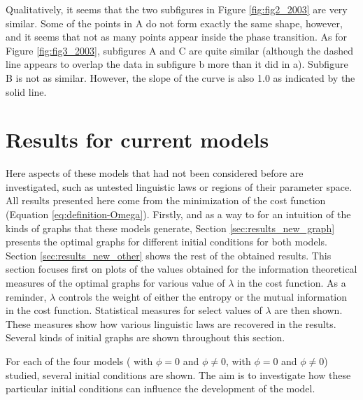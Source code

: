 Qualitatively, it seems that the two subfigures in Figure \ref{fig:fig2_2003} are very similar.
Some of the points in A do not form exactly the same shape, however, and it seems that not as many points appear inside the phase transition.
As for Figure \ref{fig:fig3_2003}, subfigures A and C are quite similar (although the dashed line appears to overlap the data in subfigure b more than it did in a).
Subfigure B is not as similar.
However, the slope of the curve is also 1.0 as indicated by the solid line.

\section{Results for current models}
\label{sec:results_new}

Here aspects of these models that had not been considered before are investigated, such as untested linguistic laws or regions of their parameter space.
All results presented here come from the minimization of the cost function (Equation \eqref{eq:definition-Omega}).
Firstly, and as a way to for an intuition of the kinds of graphs that these models generate, Section \ref{sec:results_new_graph} presents the optimal graphs for different initial conditions for both models.
Section \ref{sec:results_new_other} shows the rest of the obtained results.
This section focuses first on plots of the values obtained for the information theoretical measures of the optimal graphs for various value of $\lambda$ in the cost function.
As a reminder, $\lambda$ controls the weight of either the entropy or the mutual information in the cost function.
Statistical measures for select values of $\lambda$ are then shown.
These measures show how various linguistic laws are recovered in the results.
Several kinds of initial graphs are shown throughout this section.
\begin{redenv}
  For each of the four models (\firstmodel{} with $\phi=0$ and $\phi\neq 0$, \secondmodel with $\phi=0$ and $\phi\neq 0$) studied, several initial conditions are shown.
  The aim is to investigate how these particular initial conditions can influence the development of the model.
\end{redenv}

